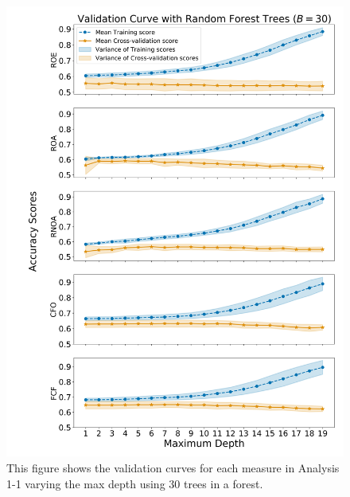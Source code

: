 \begin{figure}[htb!]
    \centering
    \includegraphics[width=\textwidth]{figures/ABIS/analysis_1-1_ValidationCurveDepth.png}

    \caption{
    		This figure shows the validation curves for each measure in Analysis 1-1 varying the max depth using  \(30\) trees in a forest. 
      }
      \label{fig:ValidationCurve-A1-Depth}
\end{figure}

\clearpage


